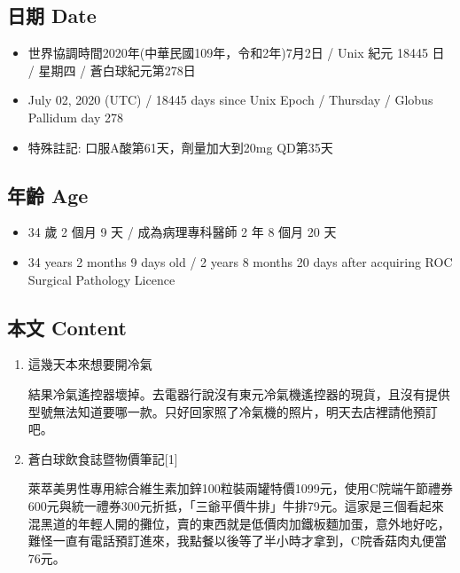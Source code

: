 \documentclass[
]{article}
\providecommand{\tightlist}{%
  \setlength{\itemsep}{0pt}\setlength{\parskip}{0pt}}
\begin{document}
\hypertarget{ux65e5ux671f-date-1}{%
\subsection{日期 Date}\label{ux65e5ux671f-date-1}}

\begin{itemize}
\tightlist
\item
  世界協調時間2020年(中華民國109年，令和2年)7月2日 / Unix 紀元 18445 日
  / 星期四 / 蒼白球紀元第278日
\item
  July 02, 2020 (UTC) / 18445 days since Unix Epoch / Thursday / Globus
  Pallidum day 278
\item
  特殊註記: 口服A酸第61天，劑量加大到20mg QD第35天
\end{itemize}

\hypertarget{ux5e74ux9f61-age-1}{%
\subsection{年齡 Age}\label{ux5e74ux9f61-age-1}}

\begin{itemize}
\tightlist
\item
  34 歲 2 個月 9 天 / 成為病理專科醫師 2 年 8 個月 20 天
\item
  34 years 2 months 9 days old / 2 years 8 months 20 days after
  acquiring ROC Surgical Pathology Licence
\end{itemize}

\hypertarget{ux672cux6587-content-1}{%
\subsection{本文 Content}\label{ux672cux6587-content-1}}

\begin{enumerate}
\def\labelenumi{\arabic{enumi}.}
\item
  這幾天本來想要開冷氣

  結果冷氣遙控器壞掉。去電器行說沒有東元冷氣機遙控器的現貨，且沒有提供型號無法知道要哪一款。只好回家照了冷氣機的照片，明天去店裡請他預訂吧。
\item
  蒼白球飲食誌暨物價筆記{[}1{]}

  萊萃美男性專用綜合維生素加鋅100粒裝兩罐特價1099元，使用C院端午節禮券600元與統一禮券300元折抵，「三爺平價牛排」牛排79元。這家是三個看起來混黑道的年輕人開的攤位，賣的東西就是低價肉加鐵板麵加蛋，意外地好吃，難怪一直有電話預訂進來，我點餐以後等了半小時才拿到，C院香菇肉丸便當76元。
\end{enumerate}
\end{document}
